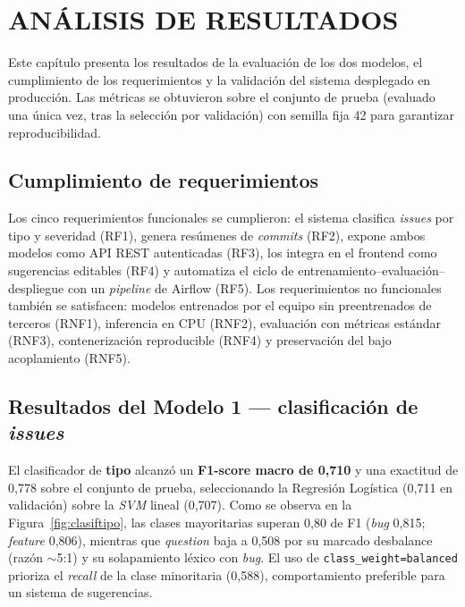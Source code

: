 %
%
\newpage

%
%

\section{ANÁLISIS DE RESULTADOS}

Este capítulo presenta los resultados de la evaluación de los dos modelos, el cumplimiento de los requerimientos y la validación del sistema desplegado en producción. Las métricas se obtuvieron sobre el conjunto de prueba (evaluado una única vez, tras la selección por validación) con semilla fija 42 para garantizar reproducibilidad.

\subsection{Cumplimiento de requerimientos}

Los cinco requerimientos funcionales se cumplieron: el sistema clasifica \textit{issues} por tipo y severidad (RF1), genera resúmenes de \textit{commits} (RF2), expone ambos modelos como \acrshort{API} \acrshort{REST} autenticadas (RF3), los integra en el frontend como sugerencias editables (RF4) y automatiza el ciclo de entrenamiento--evaluación--despliegue con un \textit{pipeline} de Airflow (RF5). Los requerimientos no funcionales también se satisfacen: modelos entrenados por el equipo sin preentrenados de terceros (RNF1), inferencia en \acrshort{CPU} (RNF2), evaluación con métricas estándar (RNF3), contenerización reproducible (RNF4) y preservación del bajo acoplamiento (RNF5).

\subsection{Resultados del Modelo 1 — clasificación de \textit{issues}}

El clasificador de \textbf{tipo} alcanzó un \textbf{F1-score macro de 0{,}710} y una exactitud de 0{,}778 sobre el conjunto de prueba, seleccionando la Regresión Logística (0{,}711 en validación) sobre la \textit{SVM} lineal (0{,}707). Como se observa en la Figura~\ref{fig:clasiftipo}, las clases mayoritarias superan 0{,}80 de F1 (\textit{bug} 0{,}815; \textit{feature} 0{,}806), mientras que \textit{question} baja a 0{,}508 por su marcado desbalance (razón $\sim$5:1) y su solapamiento léxico con \textit{bug}. El uso de \texttt{class\_weight=balanced} prioriza el \textit{recall} de la clase minoritaria (0{,}588), comportamiento preferible para un sistema de sugerencias.

